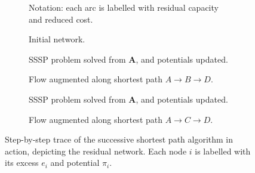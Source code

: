 \begin{figure}
    \begin{subfigure}[c]{0.5\textwidth}
        \centering
        
        \caption{Notation: each arc is labelled with residual capacity and reduced cost.} 
    \end{subfigure}
    \begin{subfigure}[c]{0.5\textwidth}
        
        \caption{Initial network.}
    \end{subfigure}
    \begin{subfigure}[c]{0.5\textwidth}
        
        \caption{SSSP problem solved from \textbf{A}, and potentials updated.}
        \label{fig:ssp-trace:first-pi}
    \end{subfigure}
    \begin{subfigure}[c]{0.5\textwidth}
        
        \label{fig:ssp-trace:first-augment}                
        \caption{Flow augmented along shortest path $A \to B \to D$.}
    \end{subfigure}
    \begin{subfigure}[c]{0.5\textwidth}
        
        \caption{SSSP problem solved from \textbf{A}, and potentials updated.}
        \label{fig:ssp-trace:second-pi}
    \end{subfigure}
    \begin{subfigure}[c]{0.5\textwidth}
        
        \label{fig:ssp-trace:second-augment}        
        \caption{Flow augmented along shortest path $A \to C \to D$.}
    \end{subfigure}
    \caption[Successive shortest path algorithm in action]{Step-by-step trace of the successive shortest path algorithm in action, depicting the residual network. Each node $i$ is labelled with its excess $e_i$ and potential $\pi_i$.}
    \label{fig:ssp-trace}
\end{figure}

